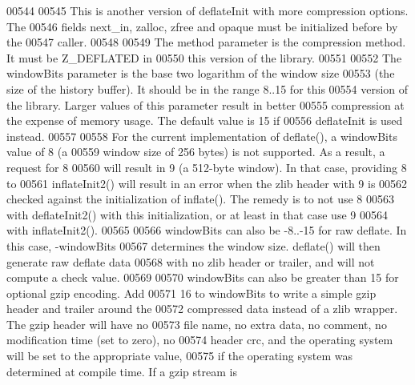 \begin{DoxyCode}
00544 \textcolor{comment}{}
00545 \textcolor{comment}{     This is another version of deflateInit with more compression options.  The}
00546 \textcolor{comment}{   fields next\_in, zalloc, zfree and opaque must be initialized before by the}
00547 \textcolor{comment}{   caller.}
00548 \textcolor{comment}{}
00549 \textcolor{comment}{     The method parameter is the compression method.  It must be Z\_DEFLATED in}
00550 \textcolor{comment}{   this version of the library.}
00551 \textcolor{comment}{}
00552 \textcolor{comment}{     The windowBits parameter is the base two logarithm of the window size}
00553 \textcolor{comment}{   (the size of the history buffer).  It should be in the range 8..15 for this}
00554 \textcolor{comment}{   version of the library.  Larger values of this parameter result in better}
00555 \textcolor{comment}{   compression at the expense of memory usage.  The default value is 15 if}
00556 \textcolor{comment}{   deflateInit is used instead.}
00557 \textcolor{comment}{}
00558 \textcolor{comment}{     For the current implementation of deflate(), a windowBits value of 8 (a}
00559 \textcolor{comment}{   window size of 256 bytes) is not supported.  As a result, a request for 8}
00560 \textcolor{comment}{   will result in 9 (a 512-byte window).  In that case, providing 8 to}
00561 \textcolor{comment}{   inflateInit2() will result in an error when the zlib header with 9 is}
00562 \textcolor{comment}{   checked against the initialization of inflate().  The remedy is to not use 8}
00563 \textcolor{comment}{   with deflateInit2() with this initialization, or at least in that case use 9}
00564 \textcolor{comment}{   with inflateInit2().}
00565 \textcolor{comment}{}
00566 \textcolor{comment}{     windowBits can also be -8..-15 for raw deflate.  In this case, -windowBits}
00567 \textcolor{comment}{   determines the window size.  deflate() will then generate raw deflate data}
00568 \textcolor{comment}{   with no zlib header or trailer, and will not compute a check value.}
00569 \textcolor{comment}{}
00570 \textcolor{comment}{     windowBits can also be greater than 15 for optional gzip encoding.  Add}
00571 \textcolor{comment}{   16 to windowBits to write a simple gzip header and trailer around the}
00572 \textcolor{comment}{   compressed data instead of a zlib wrapper.  The gzip header will have no}
00573 \textcolor{comment}{   file name, no extra data, no comment, no modification time (set to zero), no}
00574 \textcolor{comment}{   header crc, and the operating system will be set to the appropriate value,}
00575 \textcolor{comment}{   if the operating system was determined at compile time.  If a gzip stream is}

\end{DoxyCode}

